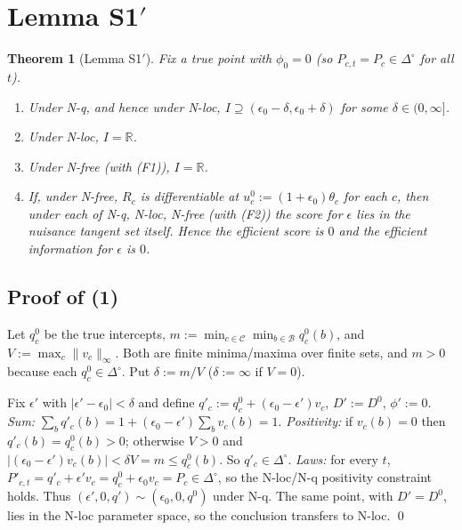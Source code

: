 \documentclass[11pt,a4paper]{article}
\newtheorem{theorem}{Theorem}
\theoremstyle{definition}
\theoremstyle{remark}
\newcommand{\R}{\mathbb{R}}
\newcommand{\B}{\mathcal{B}}
\newcommand{\C}{\mathcal{C}}
\newcommand{\simp}{\Delta^{\circ}}
\newcommand{\eps}{\epsilon}
\begin{document}
\section{Lemma S1$'$}

\begin{theorem}[Lemma S1$'$]\label{thm:S1}
Fix a true point with $\phi_0=0$ (so $P_{c,t}=P_c\in\simp$ for all $t$).
\begin{enumerate}[label=(\arabic*)]
\item Under N-q, and hence under N-loc, $I\supseteq(\eps_0-\delta,\eps_0+\delta)$
for some $\delta\in(0,\infty]$.
\item Under N-loc, $I=\R$.
\item Under N-free (with (F1)), $I=\R$.
\item If, under N-free, $R_c$ is differentiable at $u^0_c:=(1+\eps_0)\theta_c$
for each $c$, then under each of N-q, N-loc, N-free (with (F2)) the score for $\eps$
lies in the nuisance tangent set itself. Hence the efficient score is $0$ and the
efficient information for $\eps$ is $0$.
\end{enumerate}
\end{theorem}

\subsection{Proof of (1)}
Let $q^0_c$ be the true intercepts, $m:=\min_{c\in\C}\min_{b\in\B}q^0_c(b)$, and
$V:=\max_c\|v_c\|_\infty$. Both are finite minima/maxima over finite sets, and
$m>0$ because each $q^0_c\in\simp$. Put $\delta:=m/V$ ($\delta:=\infty$ if $V=0$).

Fix $\eps'$ with $|\eps'-\eps_0|<\delta$ and define $q'_c:=q^0_c+(\eps_0-\eps')v_c$,
$D':=D^0$, $\phi':=0$.
\emph{Sum:} $\sum_b q'_c(b)=1+(\eps_0-\eps')\sum_bv_c(b)=1$.
\emph{Positivity:} if $v_c(b)=0$ then $q'_c(b)=q^0_c(b)>0$; otherwise $V>0$ and
$|(\eps_0-\eps')v_c(b)|<\delta V=m\le q^0_c(b)$. So $q'_c\in\simp$.
\emph{Laws:} for every $t$, $P'_{c,t}=q'_c+\eps'v_c=q^0_c+\eps_0v_c=P_c\in\simp$,
so the N-loc/N-q positivity constraint holds. Thus
$(\eps',0,q')\sim(\eps_0,0,q^0)$ under N-q. The same point, with $D'=D^0$, lies in
the N-loc parameter space, so the conclusion transfers to N-loc. \qed
\end{document}
